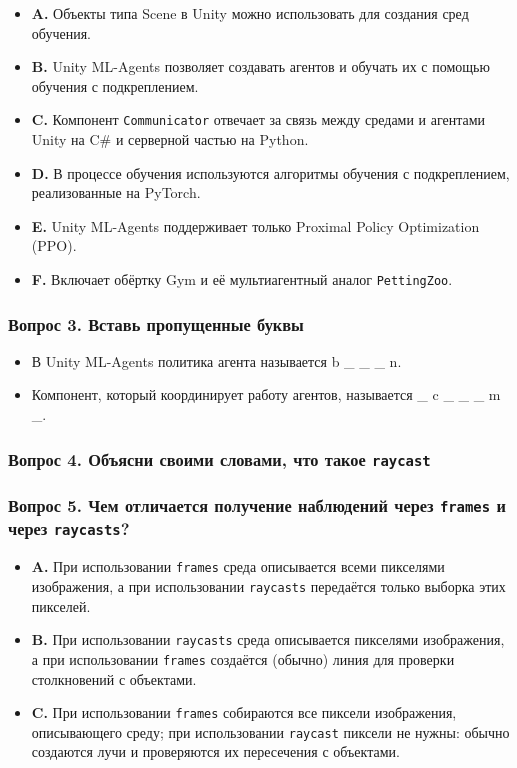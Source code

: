 \documentclass[11pt,a4paper]{article}
\begin{document}
\begin{itemize}
\tightlist
\item
  \textbf{A.} Объекты типа Scene в Unity можно использовать для создания сред обучения.
\item
  \textbf{B.} Unity ML-Agents позволяет создавать агентов и обучать их с помощью обучения с подкреплением.
\item
  \textbf{C.} Компонент \texttt{Communicator} отвечает за связь между средами и агентами Unity на C\# и серверной частью на Python.
\item
  \textbf{D.} В процессе обучения используются алгоритмы обучения с подкреплением, реализованные на PyTorch.
\item
  \textbf{E.} Unity ML-Agents поддерживает только Proximal Policy Optimization (PPO).
\item
  \textbf{F.} Включает обёртку Gym и её мультиагентный аналог \texttt{PettingZoo}.
\end{itemize}

\subsubsection{Вопрос 3. Вставь пропущенные буквы}\label{q3-fill-the-missing-letters}

\begin{itemize}
\tightlist
\item
  В Unity ML-Agents политика агента называется b \_ \_ \_ n.
\item
  Компонент, который координирует работу агентов, называется \_ c \_ \_ \_ m \_.
\end{itemize}

\subsubsection{Вопрос 4. Объясни своими словами, что такое \texttt{raycast}}\label{q4-define-with-your-own-words-what-is-a-raycast}

\subsubsection{Вопрос 5. Чем отличается получение наблюдений через \texttt{frames} и через \texttt{raycasts}?}\label{q5-which-are-the-differences-between-capturing-the-environment-using-frames-or-raycasts}

\begin{itemize}
\tightlist
\item
  \textbf{A.} При использовании \texttt{frames} среда описывается всеми пикселями изображения, а при использовании \texttt{raycasts} передаётся только выборка этих пикселей.
\item
  \textbf{B.} При использовании \texttt{raycasts} среда описывается пикселями изображения, а при использовании \texttt{frames} создаётся (обычно) линия для проверки столкновений с объектами.
\item
  \textbf{C.} При использовании \texttt{frames} собираются все пиксели изображения, описывающего среду; при использовании \texttt{raycast} пиксели не нужны: обычно создаются лучи и проверяются их пересечения с объектами.
\end{itemize}
\end{document}
